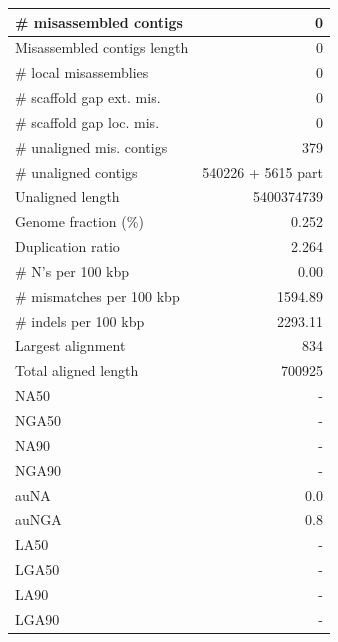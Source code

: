 \documentclass[12pt,a4paper]{article}
\begin{document}
\begin{table}[ht]
\begin{center}
\begin{tabular}{|l*{1}{|r}|}
\# misassembled contigs & 0 \\ \hline
Misassembled contigs length & 0 \\ \hline
\# local misassemblies & 0 \\ \hline
\# scaffold gap ext. mis. & 0 \\ \hline
\# scaffold gap loc. mis. & 0 \\ \hline
\# unaligned mis. contigs & 379 \\ \hline
\# unaligned contigs & 540226 + 5615 part \\ \hline
Unaligned length & 5400374739 \\ \hline
Genome fraction (\%) & 0.252 \\ \hline
Duplication ratio & 2.264 \\ \hline
\# N's per 100 kbp & 0.00 \\ \hline
\# mismatches per 100 kbp & 1594.89 \\ \hline
\# indels per 100 kbp & 2293.11 \\ \hline
Largest alignment & 834 \\ \hline
Total aligned length & 700925 \\ \hline
NA50 & - \\ \hline
NGA50 & - \\ \hline
NA90 & - \\ \hline
NGA90 & - \\ \hline
auNA & 0.0 \\ \hline
auNGA & 0.8 \\ \hline
LA50 & - \\ \hline
LGA50 & - \\ \hline
LA90 & - \\ \hline
LGA90 & - \\ \hline
\end{tabular}
\end{center}
\end{table}
\end{document}
